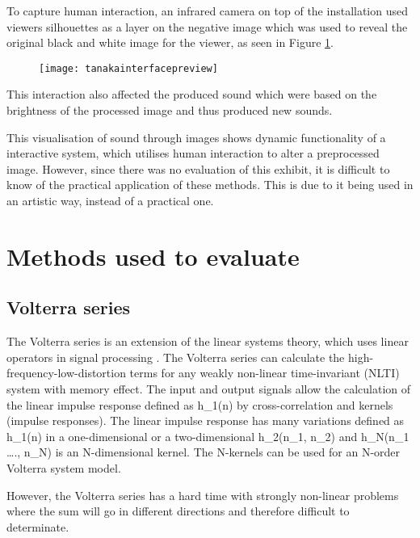 To capture human interaction, an infrared camera on top of the installation used viewers silhouettes as a layer on the negative image which was used to reveal the original black and white image for the viewer, as seen in Figure \ref{fig:tanakainterfacepreview}.

\begin{figure}[!h]
\centering
\texttt{[image: tanakainterfacepreview]}
\caption{\label{fig:tanakainterfacepreview}\cite{Tanaka2012}}
\end{figure}

This interaction also affected the produced sound which were based on the brightness of the processed image and thus produced new sounds. 

This visualisation of sound through images shows dynamic functionality of a interactive system, which utilises human interaction to alter a preprocessed image. However, since there was no evaluation of this exhibit, it is difficult to know of the practical application of these methods. This is due to it being used in an artistic way, instead of a practical one.   

\section{Methods used to evaluate}\label{sub:methodsusedtoevaluate}

\subsection{Volterra series}\label{sub:Volt}


The Volterra series is an extension of the linear systems theory, which uses linear operators in signal processing . The Volterra series can calculate the high-frequency-low-distortion terms for any weakly non-linear time-invariant (NLTI) system with memory effect.  The input and output signals allow the calculation of the linear impulse response defined as h_1(n) by cross-correlation and kernels (impulse responses). The linear impulse response has many variations defined as h_1(n) in a one-dimensional or a two-dimensional h_2(n_1, n_2) and h_N(n_1 …., n_N) is an N-dimensional kernel. The N-kernels can be used for an N-order Volterra system model. 


However, the Volterra series has a hard time with strongly non-linear problems where the sum will go in different directions and therefore difficult to determinate. 


